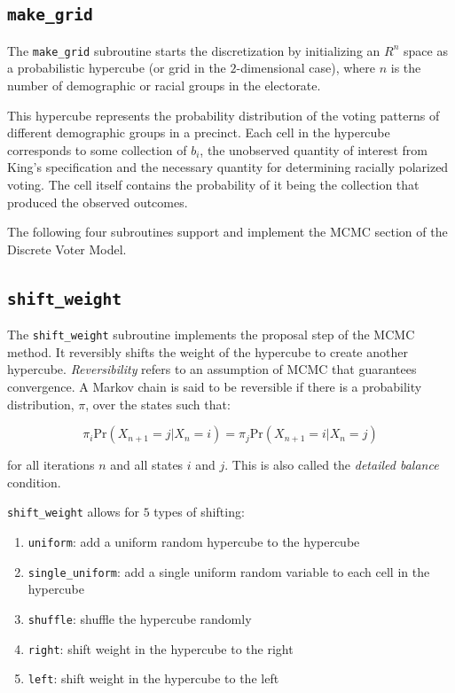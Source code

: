 \documentclass[fleqn,10pt]{style}
\begin{document}
\subsection{\texttt{make\_grid}}

The \texttt{make\_grid} subroutine starts the discretization by initializing an $R^n$ space as a probabilistic hypercube (or grid in the $2$-dimensional case), where $n$ is the number of demographic or racial groups in the electorate.

This hypercube represents the probability distribution of the voting patterns of different demographic groups in a precinct. Each cell in the hypercube corresponds to some collection of $b_i$, the unobserved quantity of interest from King's specification and the necessary quantity for determining racially polarized voting. The cell itself contains the probability of it being the collection that produced the observed outcomes.

The following four subroutines support and implement the MCMC section of the Discrete Voter Model.

\subsection{\texttt{shift\_weight}}

The \texttt{shift\_weight} subroutine implements the proposal step of the MCMC method. It reversibly shifts the weight of the hypercube to create another hypercube. \textit{Reversibility} refers to an assumption of MCMC that guarantees convergence. A Markov chain is said to be reversible if there is a probability distribution, $\pi$, over the states such that:

$$\pi_i \text{Pr}(X_{n+1} = j | X_n = i) = \pi_j \text{Pr}(X_{n+1} = i | X_n = j)$$

for all iterations $n$ and all states $i$ and $j$. This is also called the \textit{detailed balance} condition.

\texttt{shift\_weight} allows for $5$ types of shifting:

\begin{enumerate}[noitemsep]
  \item \texttt{uniform}: add a uniform random hypercube to the hypercube
  \item \texttt{single\_uniform}: add a single uniform random variable to each cell in the hypercube
  \item \texttt{shuffle}: shuffle the hypercube randomly
  \item \texttt{right}: shift weight in the hypercube to the right
  \item \texttt{left}: shift weight in the hypercube to the left
\end{enumerate}
\end{document}
